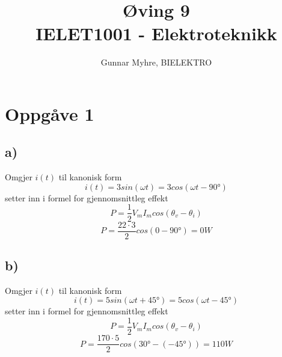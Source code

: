 \documentclass[12pt,a4paper]{article}
\title{%
  Øving 9 \\
  \large IELET1001 - Elektroteknikk \\
  }
\author{Gunnar Myhre, BIELEKTRO}
\begin{document}
  \maketitle

  \section*{Oppgåve 1}
    \subsection*{a)}
    Omgjer $i(t)$ til kanonisk form
    \begin{equation}
      i(t) = 3sin(\omega t) = 3cos(\omega t - \ang{90})
    \end{equation}
    setter inn i formel for gjennomsnittleg effekt
    \begin{equation}
      P = \frac{1}{2}V_mI_m cos(\theta _v - \theta _i)
    \end{equation}
    \begin{equation}
      P =  \frac{22\cdot3}{2}cos(0-\ang{90}) = 0W
    \end{equation}

    \subsection*{b)}
    Omgjer $i(t)$ til kanonisk form
    \begin{equation}
      i(t) = 5sin(\omega t + \ang{45}) = 5cos(\omega t - \ang{45})
    \end{equation}
    setter inn i formel for gjennomsnittleg effekt
    \begin{equation}
      P = \frac{1}{2}V_mI_m cos(\theta _v - \theta _i)
    \end{equation}
    \begin{equation}
      P = \frac{170\cdot5}{2}cos(\ang{30}-(\ang{-45})) = 110 W
    \end{equation}
\end{document}
